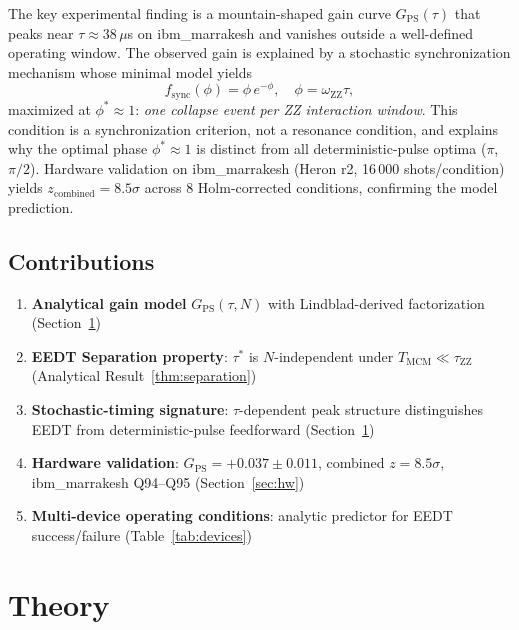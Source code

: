 \documentclass[10pt,twocolumn]{article}
\newcommand{\GPS}{G_{\mathrm{PS}}}
\newcommand{\oZZ}{\omega_{\mathrm{ZZ}}}
\newcommand{\Tmc}{T_{\mathrm{MCM}}}
\newcommand{\taustar}{\tau^*}
\begin{document}
The key experimental finding is a mountain-shaped gain curve
$\GPS(\tau)$ that peaks near $\tau \approx 38\,\mu$s on ibm\_marrakesh
and vanishes outside a well-defined operating window.
The observed gain is explained by a stochastic synchronization mechanism
whose minimal model yields
\begin{equation}
  f_\mathrm{sync}(\phi) = \phi\,e^{-\phi},
  \quad \phi = \oZZ\tau,
  \label{eq:fsync_intro}
\end{equation}
maximized at $\phi^* \approx 1$: \emph{one collapse event per ZZ
interaction window}.
This condition is a synchronization criterion, not a resonance condition,
and explains why the optimal phase $\phi^*\approx 1$ is distinct from
all deterministic-pulse optima ($\pi$, $\pi/2$).
Hardware validation on ibm\_marrakesh (Heron r2, 16\,000 shots/condition)
yields $z_\mathrm{combined} = 8.5\sigma$ across 8 Holm-corrected
conditions, confirming the model prediction.

\subsection{Contributions}

\begin{enumerate}[leftmargin=*, itemsep=1pt, topsep=2pt]
  \item \textbf{Analytical gain model} $\GPS(\tau,N)$ with Lindblad-derived
    factorization (Section~\ref{sec:theory})
  \item \textbf{EEDT Separation property}: $\taustar$ is $N$-independent
    under $\Tmc \ll \tau_\mathrm{ZZ}$ (Analytical Result~\ref{thm:separation})
  \item \textbf{Stochastic-timing signature}: $\tau$-dependent peak structure
    distinguishes EEDT from deterministic-pulse feedforward (Section~\ref{sec:theory})
  \item \textbf{Hardware validation}: $\GPS = +0.037\pm0.011$,
    combined $z = 8.5\sigma$, ibm\_marrakesh Q94--Q95
    (Section~\ref{sec:hw})
  \item \textbf{Multi-device operating conditions}: analytic predictor for
    EEDT success/failure (Table~\ref{tab:devices})
\end{enumerate}


\section{Theory}
\label{sec:theory}
\end{document}
